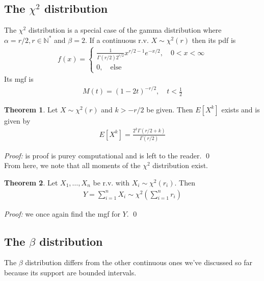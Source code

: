 \documentclass{book}
\theoremstyle{definition}
\newtheorem{thm}{Theorem}[section]
\newcommand{\f}[2]{\frac{#1}{#2}}
\newcommand{\lp}{\left(}
\newcommand{\rp}{\right)}
\begin{document}
\subsection{The $\chi^2$ distribution}

The $\chi^2$ distribution is a special case of the gamma distribution where $\alpha = r/2, r \in \mathbb{N}^*$ and $\beta = 2$. If a continuous r.v. $X \sim \chi^2(r)$ then its pdf is 
\begin{align}
\boxed{f(x) = \begin{cases}
\f{1}{\Gamma(r/2)2^{r/2}} x^{r/2-1}e^{-x/2}, \quad 0 < x < \infty\\
0, \quad \text{else}
\end{cases}}
\end{align}
Its mgf is 
\begin{align}
\boxed{M(t) = (1-2t)^{-r/2}, \quad t < \f{1}{2}}
\end{align}

\begin{thm} Let $X \sim \chi^2(r)$ and $k > -r/2$ be given. Then $ E[X^k] $ exists and is given by
\begin{align}
\boxed{E[X^k] = \f{2^k\Gamma\lp r/2 + k \rp}{\Gamma(r/2)}}
\end{align}
\end{thm}
\noindent \textit{Proof:} is proof is purey computational and is left to the reader. \qed\\

From here, we note that all moments of the $\chi^2$ distribution exist.\\

\begin{thm} Let $X_1, \dots, X_n$ be r.v. with $X_i \sim \chi^2(r_i)$. Then
\begin{align}
\boxed{Y = \sum^n_{i=1}X_i \sim \chi^2\lp \sum^n_{i=1}r_i \rp}
\end{align}
\end{thm}
\noindent \textit{Proof:} we once again find the mgf for $Y$. \qed\\


\subsection{The $\beta$ distribution}

The $\beta$ distribution differs from the other continuous ones we've discussed so far because its support are bounded intervals. \\
\end{document}
